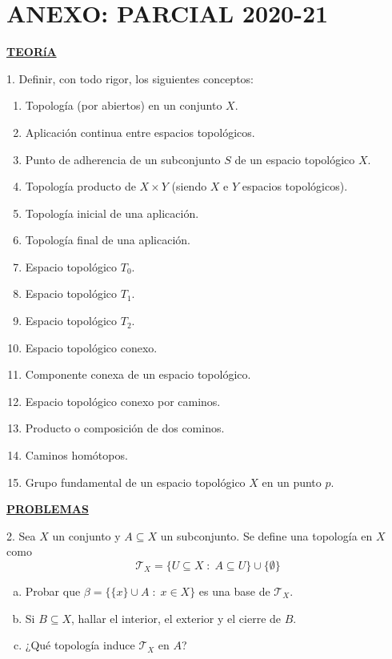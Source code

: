 \documentclass[12pt,twoside]{report}
\newcommand\mc[1]{\mathcal{#1}}
\theoremstyle{azul}
\theoremstyle{azul2}
\theoremstyle{plain}
\theoremstyle{definition}
\theoremstyle{remark}
\begin{document}
\chapter{ANEXO: PARCIAL 2020-21}
\begin{center}
    \textbf{\underline{TEORíA}}
\end{center}
1. Definir, con todo rigor, los siguientes conceptos:
\begin{enumerate}[1)]
    \item Topología (por abiertos) en un conjunto $X$.
    \item Aplicación continua entre espacios topológicos.
    \item Punto de adherencia de un subconjunto $S$ de un espacio topológico $X$.
    \item Topología producto de $X \times Y$ (siendo $X$ e $Y$ espacios topológicos).
    \item Topología inicial de una aplicación.
    \item Topología final de una aplicación. 
    \item Espacio topológico $T_0$.
    \item Espacio topológico $T_1$.
    \item Espacio topológico $T_2$.
    \item Espacio topológico conexo.
    \item Componente conexa de un espacio topológico.
    \item Espacio topológico conexo por caminos.
    \item Producto o composición de dos cominos.
    \item Caminos homótopos.
    \item Grupo fundamental de un espacio topológico $X$ en un punto $p$.
\end{enumerate}
\begin{center}
    \textbf{\underline{PROBLEMAS}}
\end{center}
2. Sea $X$ un conjunto y $A \subseteq X$ un subconjunto. Se define una topología en $X$ como 
$$\mc{T}_X=\{ U \subseteq X \; : \; A \subseteq U\} \cup \{ \emptyset \}$$
\begin{enumerate}[(a)]
    \item Probar que $\beta=\{ \{ x \} \cup A \; : \; x \in X \}$ es una base de $\mc{T}_X$.
    \item Si $B \subseteq X$, hallar el interior, el exterior y el cierre de $B$.
    \item ¿Qué topología induce $\mc{T}_X$ en $A$?
\end{enumerate}
\end{document}
